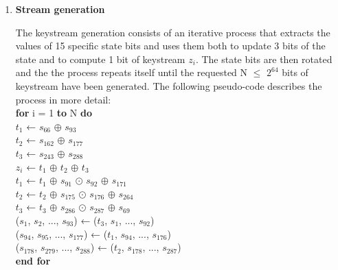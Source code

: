 \begin{enumerate}
	\item \textbf{Stream generation}
	
	The keystream generation consists of an iterative process that extracts the values of 15 specific state bits and uses them both to update 3 bits of the state and to compute 1 bit of keystream $z_i$. The state bits are then rotated and the
	the process repeats itself until the requested N $\leq$ $2^{64}$ bits of keystream have been generated. The following pseudo-code describes the process in more detail:
	\vspace{0.5em}
	\\
	{\selectfont
		\textbf{for} i = 1 \textbf{to} N \textbf{do}\\
		$t_1$ ← $s_{66}$ $\oplus$ $s_{93}$\\
		$t_2$ ← $s_{162}$ $\oplus$ $s_{177}$\\
		$t_3$ ← $s_{243}$ $\oplus$ $s_{288}$\\
		$z_i$ ← $t_1$ $\oplus$ $t_2$ $\oplus$ $t_3$\\
		$t_1$ ← $t_1$ $\oplus$ $s_{91}$ $\odot$ $s_{92}$ $\oplus$ $s_{171}$\\
		$t_2$ ← $t_2$ $\oplus$ $s_{175}$ $\odot$ $s_{176}$ $\oplus$ $s_{264}$\\
		$t_3$ ← $t_3$ $\oplus$ $s_{286}$ $\odot$ $s_{287}$ $\oplus$ $s_{69}$\\
		($s_1$, $s_2$, ..., $s_{93}$) ← ($t_3$, $s_1$, ..., $s_{92}$)\\
		($s_{94}$, $s_{95}$, ..., $s_{177}$) ← ($t_1$, $s_{94}$, ..., $s_{176}$)\\
		($s_{178}$, $s_{279}$, ..., $s_{288}$) ← ($t_2$, $s_{178}$, ..., $s_{287}$)\\
		\textbf{end for}
	}
\end{enumerate}

